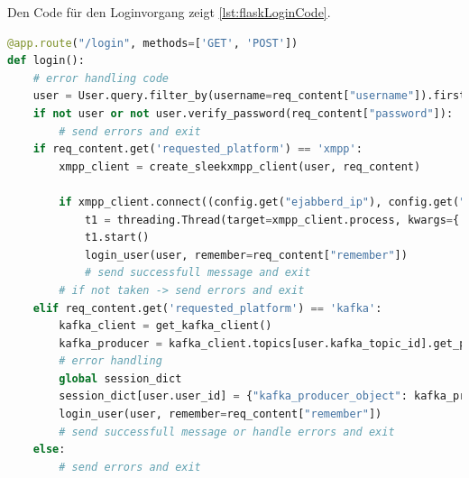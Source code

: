 \documentclass[a4paper,titlepage,halfparskip,12pt]{scrreprt}
\begin{document}
\begin{onehalfspacing}
\pagebreak

Den Code für den Loginvorgang zeigt \autoref{lst:flaskLoginCode}.

\begin{lstlisting}[language=python, caption={Code der \acs{API}-Route für den Benutzerlogin}, label={lst:flaskLoginCode}]
@app.route("/login", methods=['GET', 'POST'])
def login():
    # error handling code
    user = User.query.filter_by(username=req_content["username"]).first()
    if not user or not user.verify_password(req_content["password"]):
        # send errors and exit
    if req_content.get('requested_platform') == 'xmpp':
        xmpp_client = create_sleekxmpp_client(user, req_content)

        if xmpp_client.connect((config.get("ejabberd_ip"), config.get("ejabberd_port"))):
            t1 = threading.Thread(target=xmpp_client.process, kwargs={'block': True}, daemon=True)
            t1.start()
            login_user(user, remember=req_content["remember"])
            # send successfull message and exit
        # if not taken -> send errors and exit
    elif req_content.get('requested_platform') == 'kafka':
        kafka_client = get_kafka_client()
        kafka_producer = kafka_client.topics[user.kafka_topic_id].get_producer()
        # error handling
        global session_dict
        session_dict[user.user_id] = {"kafka_producer_object": kafka_producer, "topic": user.kafka_topic_id, "requested_platform": "kafka"}
        login_user(user, remember=req_content["remember"])
        # send successfull message or handle errors and exit
    else:
        # send errors and exit
\end{lstlisting}


\end{onehalfspacing}
\end{document}

